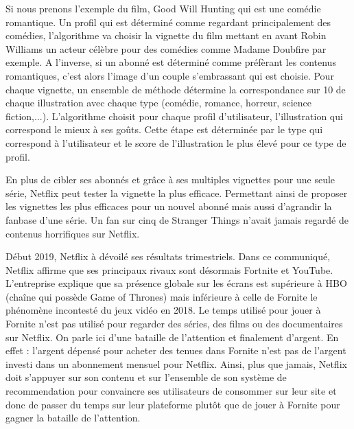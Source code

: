\vspace{5mm}

Si nous prenons l’exemple du film, Good Will Hunting qui est une comédie romantique. 
Un profil qui est déterminé comme regardant principalement des comédies, l’algorithme va choisir la vignette du film mettant en avant Robin Williams un acteur célèbre pour des comédies comme Madame Doubfire par exemple. A l’inverse, si un abonné est déterminé comme préfèrant les contenus romantiques, c’est alors l'image d'un couple s'embrassant qui est choisie. Pour chaque vignette, un ensemble de méthode détermine la correspondance sur 10 de chaque illustration avec chaque type (comédie, romance, horreur, science fiction,...). L'algorithme choisit pour chaque profil d'utilisateur, l'illustration qui correspond le mieux à ses goûts. Cette étape est déterminée par le type qui correspond à l'utilisateur et le score de l'illustration le plus élevé pour ce type de profil.  

\vspace{5mm}

En plus de cibler ses abonnés et grâce à ses multiples vignettes pour une seule série, Netflix peut tester la vignette la plus efficace. Permettant ainsi de proposer les vignettes les plus efficaces pour un nouvel abonné mais aussi d’agrandir la fanbase d’une série. Un fan sur cinq\supercite{1/5} de Stranger Things n’avait jamais regardé de contenus horrifiques sur Netflix. 

\vspace{5mm}

Début 2019, Netflix à dévoilé ses résultats trimestriels. Dans ce communiqué\supercite{fornite}, Netflix affirme que ses principaux rivaux sont désormais Fortnite et YouTube. L’entreprise explique que sa présence globale sur les écrans est supérieure à HBO (chaîne qui possède Game of Thrones) mais inférieure à celle de Fornite le phénomène incontesté du jeux vidéo en 2018. Le temps utilisé pour jouer à Fornite n’est pas utilisé pour regarder des séries, des films ou des documentaires sur Netflix. On parle ici d’une bataille de l’attention et finalement d’argent. En effet : l’argent dépensé pour acheter des tenues dans Fornite n’est pas de l’argent investi dans un abonnement mensuel pour Netflix. Ainsi, plus que jamais, Netflix doit s'appuyer sur son contenu et sur l’ensemble de son système de recommendation pour convaincre ses utilisateurs de consommer sur leur site et donc de passer du temps sur leur plateforme plutôt que de jouer à Fornite pour gagner la bataille de l'attention. 





